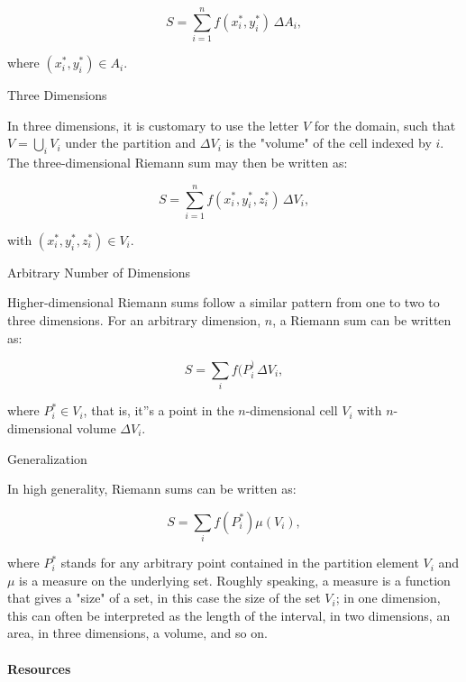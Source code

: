 $$S = \sum_{i=1}^n f(x_i^*, y_i^*) \, \Delta A_i,$$



where $(x_i^*, y_i^*) \in A_i$.



Three Dimensions



In three dimensions, it is customary to use the letter $V$ for the domain, such that $V = \bigcup_i V_i$ under the partition and $\Delta V_i$ is the "volume" of the cell indexed by $i$. The three-dimensional Riemann sum may then be written as:



$$S = \sum_{i=1}^{n} f(x_i^*, y_i^*, z_i^*) \, \Delta V_i,$$



with $(x_i^*, y_i^*, z_i^*) \in V_i$.



Arbitrary Number of Dimensions



Higher-dimensional Riemann sums follow a similar pattern from one to two to three dimensions. For an arbitrary dimension, $n$, a Riemann sum can be written as:



$$ S = \sum_i f(P_i^) \, \Delta V_i,$$



where $P_i^* \in V_i$, that is, it''s a point in the $n$-dimensional cell $V_i$ with $n$-dimensional volume $\Delta V_i$.



Generalization



In high generality, Riemann sums can be written as:



$$S = \sum_i f(P_i^*) \mu(V_i),$$



where $P_i^*$ stands for any arbitrary point contained in the partition element $V_i$ and $\mu$ is a measure on the underlying set. Roughly speaking, a measure is a function that gives a "size" of a set, in this case the size of the set $V_i$; in one dimension, this can often be interpreted as the length of the interval, in two dimensions, an area, in three dimensions, a volume, and so on.



\paragraph{Resources}



